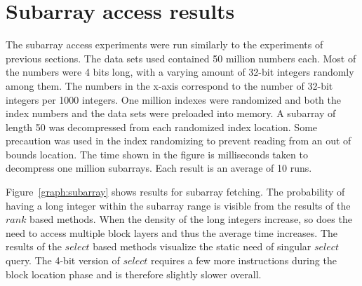\section{Subarray access results}

The subarray access experiments were run similarly to the experiments of previous sections. The data sets used contained 50 million numbers each. Most of the numbers were 4 bits long, with a varying amount of 32-bit 
integers randomly among them. The numbers in the x-axis correspond to the number of 32-bit integers per 1000 integers. One million indexes were randomized and both the index numbers and the data sets were 
preloaded into memory. A subarray of length 50 was decompressed from each randomized index location. Some precaution was used in the index randomizing to prevent reading from an out of bounds location. The 
time shown in the figure is milliseconds taken to decompress one million subarrays. Each result is an average of 10 runs. 

Figure~\ref{graph:subarray} shows results for subarray fetching. The probability of having a long integer within the subarray range is visible from the results of the $rank$ based methods. When the density of the long integers increase, so does the need to access multiple 
block layers and thus the average time increases. The results of the $select$ based methods visualize the static need of singular $select$ query. The 4-bit version of $select$ requires a few more instructions 
during the block location phase and is therefore slightly slower overall. 


